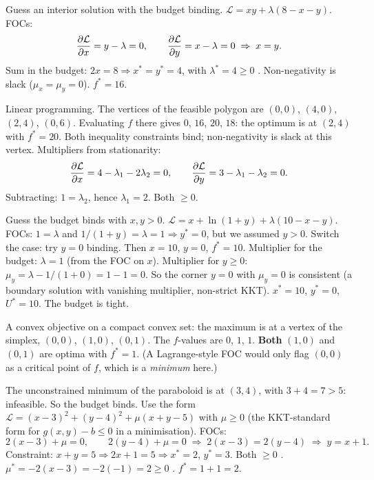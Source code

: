 \begin{solutions}
  \item Guess an interior solution with the budget binding.
        $\mathcal{L} = x y + \lambda(8 - x - y)$. FOCs:
        \[
          \frac{\partial \mathcal{L}}{\partial x} = y - \lambda = 0, \qquad
          \frac{\partial \mathcal{L}}{\partial y} = x - \lambda = 0
          \;\Rightarrow\; x = y .
        \]
        Sum in the budget: $2 x = 8 \Rightarrow x^* = y^* = 4$, with
        $\lambda^* = 4 \geq 0$ \checkmark. Non-negativity is slack
        ($\mu_x = \mu_y = 0$). $f^* = 16$.

  \item Linear programming. The vertices of the feasible polygon are
        $(0, 0)$, $(4, 0)$, $(2, 4)$, $(0, 6)$. Evaluating $f$ there gives
        $0$, $16$, $20$, $18$: the optimum is at $(2, 4)$ with $f^* = 20$.
        Both inequality constraints bind; non-negativity is slack at this
        vertex. Multipliers from stationarity:
        \[
          \frac{\partial \mathcal{L}}{\partial x} = 4 - \lambda_1 - 2 \lambda_2 = 0, \qquad
          \frac{\partial \mathcal{L}}{\partial y} = 3 - \lambda_1 - \lambda_2 = 0 .
        \]
        Subtracting: $1 = \lambda_2$, hence $\lambda_1 = 2$. Both $\geq 0$.
        \checkmark

  \item Guess the budget binds with $x, y > 0$.
        $\mathcal{L} = x + \ln(1 + y) + \lambda(10 - x - y)$. FOCs:
        $1 = \lambda$ and $1/(1 + y) = \lambda = 1 \Rightarrow y^* = 0$,
        but we assumed $y > 0$. Switch the case: try $y = 0$ binding. Then
        $x = 10$, $y = 0$, $f^* = 10$. Multiplier for the budget:
        $\lambda = 1$ (from the FOC on $x$). Multiplier for $y \geq 0$:
        $\mu_y = \lambda - 1/(1 + 0) = 1 - 1 = 0$. So the corner $y = 0$
        with $\mu_y = 0$ is consistent (a boundary solution with vanishing
        multiplier, non-strict KKT). $x^* = 10$, $y^* = 0$, $U^* = 10$.
        The budget is tight.

  \item A convex objective on a compact convex set: the maximum is at a
        vertex of the simplex, $(0, 0)$, $(1, 0)$, $(0, 1)$. The
        $f$-values are $0$, $1$, $1$. \textbf{Both} $(1, 0)$ and $(0, 1)$
        are optima with $f^* = 1$. (A Lagrange-style FOC would only flag
        $(0, 0)$ as a critical point of $f$, which is a \emph{minimum}
        here.)

  \item The unconstrained minimum of the paraboloid is at $(3, 4)$, with
        $3 + 4 = 7 > 5$: infeasible. So the budget binds. Use the form
        $\mathcal{L} = (x - 3)^2 + (y - 4)^2 + \mu(x + y - 5)$ with
        $\mu \geq 0$ (the KKT-standard form for $g(x,y) - b \leq 0$ in a
        minimisation). FOCs:
        \[
          2(x - 3) + \mu = 0, \qquad 2(y - 4) + \mu = 0
          \;\Rightarrow\; 2(x - 3) = 2(y - 4)
          \;\Rightarrow\; y = x + 1 .
        \]
        Constraint: $x + y = 5 \Rightarrow 2 x + 1 = 5 \Rightarrow
        x^* = 2$, $y^* = 3$. Both $\geq 0$ \checkmark.
        $\mu^* = -2(x - 3) = -2(-1) = 2 \geq 0$ \checkmark.
        $f^* = 1 + 1 = 2$.


\end{solutions}
